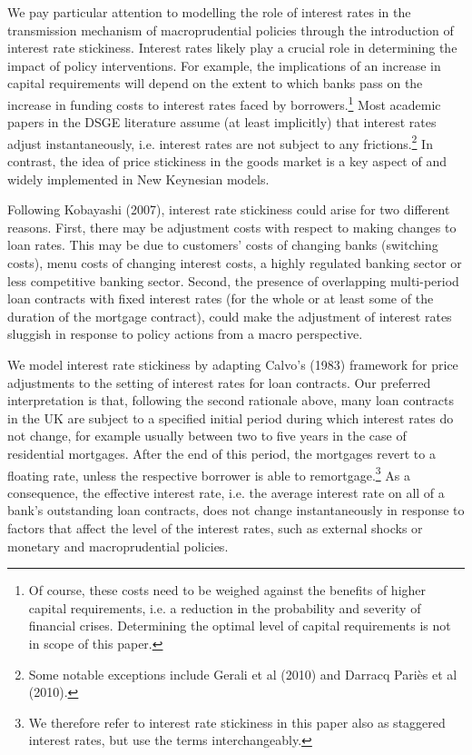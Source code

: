 \documentclass[12pt]{article}
\numberwithin{equation}{section}
\begin{document}
We pay particular attention to modelling the role of interest rates in the transmission mechanism of macroprudential policies through the introduction of interest rate stickiness. Interest rates likely play a crucial role in determining the impact of policy interventions. For example, the implications of an increase in capital requirements will depend on the extent to which banks pass on the increase in funding costs to interest rates faced by borrowers.\footnote{Of course, these costs need to be weighed against the benefits of higher capital requirements, i.e. a reduction in the probability and severity of financial crises. Determining the optimal level of capital requirements is not in scope of this paper.}  Most academic papers in the DSGE literature assume (at least implicitly) that interest rates adjust instantaneously, i.e. interest rates are not subject to any frictions.\footnote{Some notable exceptions include Gerali et al (2010) and Darracq Pariès et al (2010).}  In contrast, the idea of price stickiness in the goods market is a key aspect of and widely implemented in New Keynesian models. 

Following Kobayashi (2007), interest rate stickiness could arise for two different reasons. First, there may be adjustment costs with respect to making changes to loan rates. This may be due to customers’ costs of changing banks (switching costs), menu costs of changing interest costs, a highly regulated banking sector or less competitive banking sector. Second, the presence of overlapping multi-period loan contracts with fixed interest rates (for the whole or at least some of the duration of the mortgage contract), could make the adjustment of interest rates sluggish in response to policy actions from a macro perspective.

We model interest rate stickiness by adapting Calvo’s (1983) framework for price adjustments to the setting of interest rates for loan contracts. Our preferred interpretation is that, following the second rationale above, many loan contracts in the UK are subject to a specified initial period during which interest rates do not change, for example usually between two to five years in the case of residential mortgages. After the end of this period, the mortgages revert to a floating rate, unless the respective borrower is able to remortgage.\footnote{We therefore refer to interest rate stickiness in this paper also as staggered interest rates, but use the terms interchangeably.}  As a consequence, the effective interest rate, i.e. the average interest rate on all of a bank’s outstanding loan contracts, does not change instantaneously in response to factors that affect the level of the interest rates, such as external shocks or monetary and macroprudential policies. 
\end{document}
